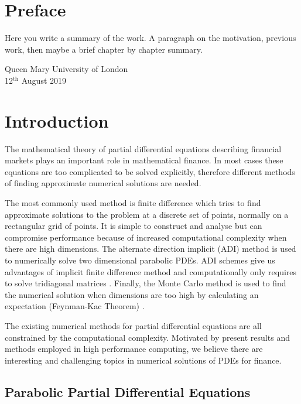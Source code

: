 \documentclass[12pt, oneside]{book}
\theoremstyle{plain}
\theoremstyle{definition}
\begin{document}
\chapter*{Preface}
Here  you write a summary of the work. A paragraph on the motivation, previous work, then maybe a brief chapter by chapter summary. 

\lipsum[100]%



\begin{flushright}
Queen Mary University of London\\
12${}^{\text{th}}$ August 2019
\end{flushright}


\tableofcontents

\chapter{Introduction}



The mathematical theory of partial differential equations describing financial markets plays an important role in mathematical finance. In most cases these equations are too complicated to be solved explicitly, therefore different methods of finding approximate numerical solutions are needed.

The most commonly used method is finite difference which tries to find approximate solutions to the problem at a discrete set of points, normally on a rectangular grid of points. It is simple to construct and analyse but can compromise performance because of increased computational complexity when there are high dimensions. The alternate direction implicit (ADI) method is used to numerically solve two dimensional parabolic PDEs. ADI schemes give us advantages of implicit finite difference method and computationally only requires to solve tridiagonal matrices \cite{thomas}. Finally, the Monte Carlo method is used to find the numerical solution when dimensions are too high by calculating an expectation (Feynman-Kac Theorem) \cite{klebaner}.

The existing numerical methods for partial differential equations are all constrained by the computational complexity. Motivated by present results and methods employed in high performance computing, we believe there are interesting and challenging topics in numerical solutions of PDEs for finance.
\section{Parabolic Partial Differential Equations}\label{Parabolic Partial Differential Equations}
\lipsum[5]
\end{document}
